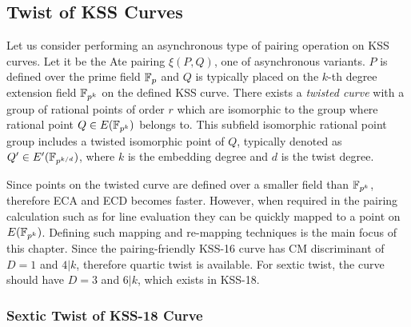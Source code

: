 \subsection{Twist of KSS Curves}
Let us consider performing an asynchronous type of pairing operation on KSS curves.  Let it be the Ate pairing $\xi(P,Q)$, one of asynchronous variants. $P$  is defined over the prime field $\mathbb{F}_p$ and  $Q$ is typically placed on the $k$-th degree extension field $\mathbb{F}_{p^k}$ on the defined KSS curve. There exists a \textit{twisted curve} with a group of rational points of order $r$ which are isomorphic to the group where rational point $Q \in  E(\mathbb{F}_{p^k})$  belongs to. This subfield isomorphic rational point group includes a twisted isomorphic point of $Q$, typically denoted as $Q' \in E'(\mathbb{F}_{p^{k/d}})$, where $k$ is the embedding degree and $d$ is the twist degree.  

Since points on the twisted curve are defined over a smaller field than $\mathbb{F}_{p^k}$, therefore ECA and ECD becomes faster. 
However, when required in the pairing calculation such as  for line evaluation  they can be quickly mapped to a point on $E(\mathbb{F}_{p^k} )$. 
Defining such mapping and re-mapping techniques is the main focus of this  chapter. Since the pairing-friendly KSS-16 \cite{EPRINT:KacSchSco07} curve has CM discriminant of $D = 1$ and $4|k$, therefore quartic twist is available. For sextic twist, the curve should have $D = 3$ and $6|k$, which exists in KSS-18.

\subsubsection{Sextic Twist of KSS-18 Curve}

